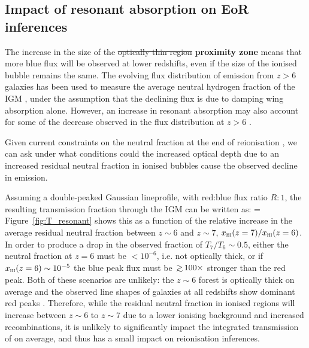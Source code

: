 \documentclass[fleqn,usenatbib]{mnras}
\providecommand{\DIFadd}[1]{{\protect\color{Green} {\bf #1}}} %
\providecommand{\DIFdel}[1]{{\protect\color{Gray} \scriptsize \sout{#1}}} %
\providecommand{\DIFaddbegin}{} %
\providecommand{\DIFaddend}{} %
\providecommand{\DIFdelbegin}{} %
\providecommand{\DIFdelend}{} %
\newcommand{\DIFscaledelfig}{0.5}
\newlength{\DIFdelgraphicswidth} %
\newlength{\DIFdelgraphicsheight} %
\newcommand{\DIFaddincludegraphics}[2][]{{\color{purple}\fbox{\DIFOincludegraphics[#1]{#2}}}} %
\newcommand{\DIFdelincludegraphics}[2][]{%
\sbox{\DIFdelgraphicsbox}{\DIFOincludegraphics[#1]{#2}}%
\settoboxwidth{\DIFdelgraphicswidth}{\DIFdelgraphicsbox} %
\settoboxtotalheight{\DIFdelgraphicsheight}{\DIFdelgraphicsbox} %
\scalebox{\DIFscaledelfig}{%
\parbox[b]{\DIFdelgraphicswidth}{\usebox{\DIFdelgraphicsbox}\\[-\baselineskip] \rule{\DIFdelgraphicswidth}{0em}}\llap{\resizebox{\DIFdelgraphicswidth}{\DIFdelgraphicsheight}{%
\setlength{\unitlength}{\DIFdelgraphicswidth}%
\begin{picture}(1,1)%
\thicklines\linethickness{2pt} %
{\color[rgb]{1,0,0}\put(0,0){\framebox(1,1){}}}%
{\color[rgb]{1,0,0}\put(0,0){\line( 1,1){1}}}%
{\color[rgb]{1,0,0}\put(0,1){\line(1,-1){1}}}%
\end{picture}%
}\hspace*{3pt}}} %
} %
\DeclareRobustCommand{\DIFaddbegin}{\DIFOaddbegin \let\includegraphics\DIFaddincludegraphics} %
\DeclareRobustCommand{\DIFaddend}{\DIFOaddend \let\includegraphics\DIFOincludegraphics} %
\DeclareRobustCommand{\DIFdelbegin}{\DIFOdelbegin \let\includegraphics\DIFdelincludegraphics} %
\DeclareRobustCommand{\DIFdelend}{\DIFOaddend \let\includegraphics\DIFOincludegraphics} %
\begin{document}
\DIFaddend %
\subsection{Impact of resonant absorption on EoR inferences}
\label{sec:disc_lyafrac}

The increase in the size of the \DIFdelbegin \DIFdel{optically thin region }\DIFdelend \DIFaddbegin \DIFadd{proximity zone }\DIFaddend means that more blue flux will be observed at lower redshifts, even if the size of the ionised bubble remains the same. The evolving flux distribution of \lya emission from $z>6$ galaxies has been used to measure the average neutral hydrogen fraction of the IGM \citep{Mesinger2015,Mason2018}, under the assumption that the declining flux is due to damping wing absorption alone. However, an increase in resonant absorption may also account for some of the decrease observed in the \lya flux distribution at $z>6$ \citep[see e.g.,][]{Bolton2013a,Mesinger2015}.

Given current constraints on the neutral fraction at the end of reionisation \citep[$z<6$,][]{Fan2006}, we can ask under what conditions could the increased optical depth due to an increased residual neutral fraction in ionised bubbles cause the observed decline in \lya emission.

Assuming a double-peaked Gaussian \lya lineprofile, with red:blue flux ratio $R:1$, the resulting \lya transmission fraction through the IGM can be written as:
%
\BE \label{eqn:T_lya}
 = 
\EE
%
Figure~\ref{fig:T_resonant} shows this as a function of the relative increase in the average residual neutral fraction between $z\sim6$ and $z\sim7$, $\xHI(z=7)/\xHI(z=6)$. In order to produce a drop in the observed \lya fraction of $T_7/T_6 \sim 0.5$, either the neutral fraction at $z=6$ must be $<10^{-6}$, i.e. not optically thick, or if $\xHI(z=6) \sim 10^{-5}$ the blue peak flux must be $\simgt100\times$ stronger than the red peak. Both of these scenarios are unlikely: the $z\sim6$ \lya forest is optically thick on average \citep[e.g,][find $\xHI(z \sim 6) \simgt 10^{-4}$]{Fan2006} and the observed \lya line shapes of galaxies at all redshifts show dominant red peaks \citep[e.g.,][]{Trainor2015,Rivera-Thorsen2015,Yang2017a,Steidel2018}. Therefore, while the residual neutral fraction in ionised regions will increase between $z\sim6$ to $z\sim7$ due to a lower ionising background and increased recombinations, it is unlikely to significantly impact the integrated transmission of \lya on average, and thus has a small impact on reionisation inferences. 
\end{document}

